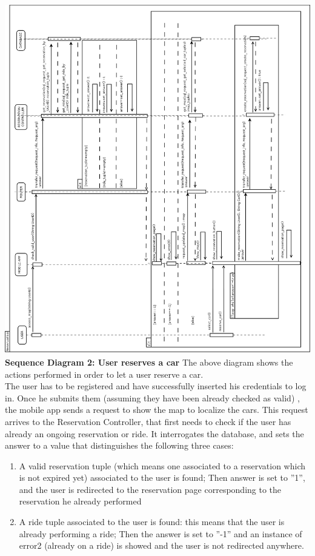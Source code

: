 \documentclass{article}
\begin{document}
\begin{flushleft}
\newpage
\includegraphics[scale=0.3]{seq2_reservation} 
\newpage
\textbf{Sequence Diagram 2: User reserves a car}
\break
The above diagram shows the actions performed in order to let a user reserve a car. \\
The user has to be registered and have successfully inserted his credentials to log in. Once he submits them (assuming they have been already checked as valid) , the mobile app sends a request to show the map to localize the cars. This request arrives to the Reservation Controller, that first needs to check if the user has already an ongoing reservation or ride. It interrogates the database, and sets the answer to a value that distinguishes the following three cases:
\begin{enumerate}
\item A valid reservation tuple (which means one associated to a reservation which is not expired yet) associated to the user is found; Then answer is set to ''1'', and the user is redirected to the reservation page corresponding to the reservation he already performed
\item A ride tuple associated to the user is found: this means that the user is already performing a ride; Then the answer is set to ''-1'' and an instance of error2 (already on a ride) is showed and the user is not redirected anywhere.

\end{enumerate}
\end{flushleft}
\end{document}
